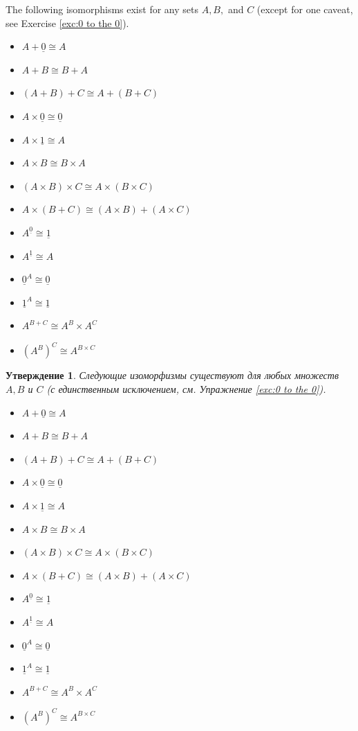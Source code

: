 \documentclass[a4paper]{book}
\def\iso{\cong}
\def\ul{\underline}
\theoremstyle{myth}
\newtheorem{propositionENG}[envENG]{\begin{english}Proposition\end{english}}
\newtheorem{propositionRUS}[envRUS]{Утверждение}
\begin{document}
\begin{russian}
\begin{propositionENG}\label{prop:arithmetic of sets}
The following isomorphisms exist for any sets $A,B,$ and $C$ (except for one caveat, see Exercise \ref{exc:0 to the 0}). 
 
\begin{itemize}
\item $A+\ul{0}\iso A$
\item $A + B\iso B + A$
\item $(A + B) + C \iso A + (B + C)$
\item $A\times\ul{0}\iso\ul{0}$
\item $A\times\ul{1}\iso A$
\item $A\times B\iso B\times A$
\item $(A\times B)\times C \iso A\times (B\times C)$
\item $A\times(B+C)\iso (A\times B)+(A\times C)$
\item $A^{\ul{0}}\iso \ul{1}$
\item $A^{\ul{1}}\iso A$
\item $\ul{0}^A\iso\ul{0}$
\item $\ul{1}^A\iso\ul{1}$
\item $A^{B+C}\iso A^B\times A^C$
\item $(A^B)^C\iso A^{B\times C}$
\end{itemize}
\end{propositionENG}

\begin{propositionRUS}\label{prop:arithmetic of sets}
Следующие изоморфизмы существуют для любых множеств $A,B$ и $C$ (с единственным исключением, см. Упражнение \ref{exc:0 to the 0}). 
 
\begin{itemize}
\item $A+\ul{0}\iso A$
\item $A + B\iso B + A$
\item $(A + B) + C \iso A + (B + C)$
\item $A\times\ul{0}\iso\ul{0}$
\item $A\times\ul{1}\iso A$
\item $A\times B\iso B\times A$
\item $(A\times B)\times C \iso A\times (B\times C)$
\item $A\times(B+C)\iso (A\times B)+(A\times C)$
\item $A^{\ul{0}}\iso \ul{1}$
\item $A^{\ul{1}}\iso A$
\item $\ul{0}^A\iso\ul{0}$
\item $\ul{1}^A\iso\ul{1}$
\item $A^{B+C}\iso A^B\times A^C$
\item $(A^B)^C\iso A^{B\times C}$
\end{itemize}
\end{propositionRUS}


\end{russian}
\end{document}
